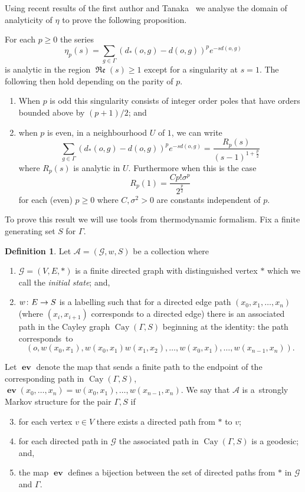 \documentclass[10pt]{amsart}
\theoremstyle{definition}\newtheorem{defi}[theo]{Definition}\newtheorem{rema}[theo]{Remark}\newtheorem{exam}[theo]{Example}\newtheorem{exem}[theo]{Example}\newtheorem{nota}[theo]{Notation}
\newcommand{\G}{\Gamma}
\newcommand{\Ac}{\mathcal{A}}
\newcommand{\Gc}{\mathcal{G}}
\DeclareMathOperator{\fkRe}{\mathfrak{Re}}
\DeclareMathOperator{\Cay}{Cay}
\DeclareMathOperator{\ev}{\mathbf{ev}}
\renewcommand*{\to}{\mathchoice{\longrightarrow}{\rightarrow}{\rightarrow}{\rightarrow}}
\newcounter{setofcase}
\newcounter{case}[setofcase]
\theoremstyle{plain}
\begin{document}
Using recent results of the first author and Tanaka~\cite{cantrell,cantrell.tanaka.2} we analyse the domain of analyticity of $\eta$ to prove the following proposition.

\begin{prop}\label{prop.analytic}
For each $p \ge 0$ the series
\[
\eta_p(s) = \sum_{g\in\G} (d_\ast(o,g) - d(o,g))^p e^{-sd(o,g)}
\]
is analytic in the region $\fkRe(s) \ge 1$ except for a singularity at $s = 1$. The following then hold depending on the parity of $p$.
\begin{enumerate}
\item\label{prop2.9.1} When $p$ is odd this singularity consists of integer order poles that have orders bounded above by $(p+1)/2$; and
\item\label{prop2.9.2} when $p$ is even, in a neighbourhood $U$ of $1$, we can write
\[
\sum_{g\in\G} (d_\ast(o,g) - d(o,g))^p e^{-sd(o,g)} = \frac{R_p(s)}{(s-1)^{1 + \frac{p}{2}}}
\]
where $R_p(s)$ is analytic in $U$. Furthermore when this is the case
\[
R_p(1) = \frac{C p! \sigma^p}{2^{\frac{p}{2}}}
\]
for each (even) $ p \ge 0$ where $C, \sigma^2 >0$ are constants independent of $p$.
\end{enumerate}
\end{prop}

To prove this result we will use tools from thermodynamic formalism. Fix a finite generating set $S$ for $\G$.

\begin{defi}\label{def.sms}
Let $\Ac=(\Gc, w, S)$ be a collection where
\begin{enumerate}
\item\label{defi2.10.1} $\Gc=(V, E, \ast)$ is a finite directed graph with distinguished vertex $\ast$ which we call the \emph{initial state}; and,
\item\label{defi2.10.2} $w\colon E \to S$ is a labelling such that for a directed edge path $(x_0, x_1, \dots, x_{n})$ (where $(x_i, x_{i+1})$ corresponds to a directed edge) there is an associated path in the Cayley graph $\Cay(\G, S)$ beginning at the identity: the path corres\-ponds~to
\[
(o, w(x_0,x_1), w(x_0,x_1)w(x_1,x_2), \dots, w(x_0,x_1),\dots, w(x_{n-1}, x_n)).
\]
\end{enumerate}
Let $\ev$ denote the map that sends a finite path to the endpoint of the corresponding path in $\Cay(\G,S)$, $\ev(x_0,\dots, x_n) = w(x_0,x_1), \dots, w(x_{n-1},x_n)$. We say that $\Ac$ is a~strongly Markov structure for the pair $\G, S$ if
\begin{enumerate}
\setcounter{enumi}{2}
\item\label{defi2.10.3} for each vertex $v\in V$ there exists a directed path from $\ast$ to $v$;
\item\label{defi2.10.4} for each directed path in $\Gc$ the associated path in $\Cay(\G, S)$ is a geodesic; and,
\item\label{defi2.10.5} the map $\ev$ defines a bijection between the set of directed paths from $\ast$ in $\Gc$ and $\G$.
\end{enumerate}
\end{defi}
\end{document}
